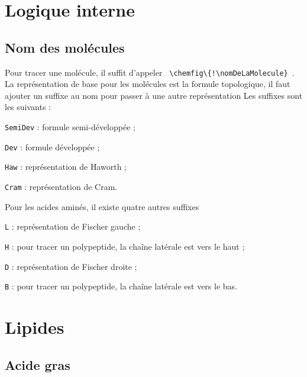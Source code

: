 \documentclass[12pt]{extarticle}
\begin{document}
  \tableofcontents
  
  \section{Logique interne}
  
  \subsection{Nom des molécules}
  
  Pour tracer une molécule, il suffit d'appeler \lstinline| \chemfig\{!\nomDeLaMolecule} |.
  La représentation de base pour les molécules est la formule topologique, il faut ajouter un suffixe au nom pour passer à une autre représentation  Les suffixes sont les suivants :
  \begin{listePoints}[2]
    \item \lstinline{SemiDev} : formule semi-développée ;
    \item \lstinline{Dev} : formule développée ;
    \item \lstinline{Haw} : représentation de Haworth ;
    \item \lstinline{Cram} : représentation de Cram.
  \end{listePoints}
  Pour les acides aminés, il existe quatre autres suffixes
  \begin{listePoints}[2]
    \item \lstinline{L} : représentation de Fischer gauche ;
    \item \lstinline{H} : pour tracer un polypeptide, la chaîne latérale est vers le haut ;
    \item \lstinline{D} : représentation de Fischer droite ;
    \item \lstinline{B} : pour tracer un polypeptide, la chaîne latérale est vers le bas.
  \end{listePoints}
  
  \section{Lipides}
  \subsection{Acide gras}
  
\end{document}
